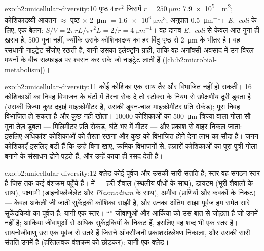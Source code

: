 \begin{solution}{exo:b2:unicellular-diversity:10}
पृष्ठ $4\pi r^2$ जिसमें $r = \qty{250}{\micro m}$: \qty{7.9e5}{\micro
m^2}; कोशिकाद्रव्यी आयतन $\approx$ पृष्ठ $\times$ \qty{2}{\micro m}
$= \qty{1.6e6}{\micro m^3}$; अनुपात \qty{0.5}{\micro m^{-1}}।
\emph{E.~coli} के लिए, एक बेलन: $S/V = 2\pi r L/\pi r^2 L = 2/r =
\qty{4}{\micro m^{-1}}$। वह दानव \emph{E.~coli} से केवल आठ गुना ही
ख़राब है, 500 गुना नहीं, क्योंकि उसके कोशिकाद्रव्य का हर बिंदु पृष्ठ से
\qty{2}{\micro m} के भीतर है। वह रसधानी नाइट्रेट सँजोए रखती है, यानी
उसका इलेक्ट्रॉन ग्राही, ताकि वह अनॉक्सी अवसाद में उन विरल मथनों के बीच
सल्फाइड पर श्वसन कर सके जो नाइट्रेट लाती हैं
(\cref{ch:b2:microbial-metabolism})।
\end{solution}

\begin{solution}{exo:b2:unicellular-diversity:11}
कोई कोशिका एक साथ तैर और विभाजित नहीं हो सकती। 16 कोशिकाओं का निवह
विभाजन के घंटों में तैरना रोक दे तो स्टोक्स के नियम से उपेक्षणीय
दूरी डूबता है (उसकी त्रिज्या कुछ दहाई माइक्रोमीटर है, उसकी डूबन-चाल
माइक्रोमीटर प्रति सेकंड); पूरा निवह विभाजित हो सकता है और कुछ नहीं
खोता। \num{10000} कोशिकाओं का \qty{500}{\micro m} त्रिज्या वाला गोला सौ
गुना तेज़ डूबता --- मिलिमीटर प्रति सेकंड, घंटे भर में मीटर --- और
प्रकाश से बाहर निकल जाता: इसलिए अधिकांश कोशिकाओं को तैरता रखना और कुछ
को विभाजित होने देना लाभ का सौदा है। जनन कोशिकाएँ इसलिए बड़ी हैं कि
उन्हें बिना खाए, क्रमिक विभाजनों से, हज़ारों कोशिकाओं का पूरा
पुत्री-गोला बनाने के संसाधन ढोने पड़ते हैं, और उन्हें काया ही रसद देती
है।
\end{solution}

\begin{solution}{exo:b2:unicellular-diversity:12}
क्लेड कोई पूर्वज और उसकी सारी संतति है; स्तर वह संगठन-स्तर है जिस तक
कई वंशक्रम पहुँचे हैं।  में --- हरी शैवाल (स्थलीय पौधों के
साथ), डायटम (भूरी शैवालों के साथ), पक्ष्माभी (डाइनोफ्लैजेलेट और
\emph{Plasmodium} के साथ), अमीबा (प्राणियों और कवकों के निकट) --- केवल
अकेली जी जाती सुकेंद्रकी कोशिका साझी है, और उनका अंतिम साझा पूर्वज हम
समेत सारे सुकेंद्रकियों का पूर्वज है: यानी एक स्तर। ``''
जीवाणुओं और आर्किया को उस बात से जोड़ता है जो उनमें नहीं है; आर्किया
जीवाणुओं से अधिक सुकेंद्रकियों के निकट हैं, इसलिए वह शब्द भी एक स्तर
है। सायनोजीवाणु उस एक पूर्वज से उतरे हैं जिसने ऑक्सीजनी प्रकाशसंश्लेषण
निकाला, और उसकी सारी संतति उनमें है (हरितलवक वंशक्रम को छोड़कर): यानी
एक क्लेड।
\end{solution}

